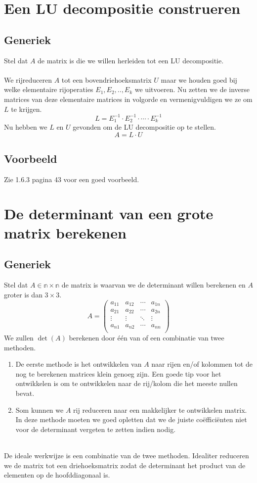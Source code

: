 \documentclass[lineaire_algebra_oplossingen.tex]{subfiles}
\begin{document}
\section{Een LU decompositie construeren}
\subsection*{Generiek}
Stel dat $A$ de matrix is die we willen herleiden tot een LU decompositie.\\\\
We rijreduceren $A$ tot een bovendriehoeksmatrix $U$ maar we houden goed bij welke elementaire rijoperaties $E_1,E_2,..,E_k$ we uitvoeren. Nu zetten we de inverse matrices van deze elementaire matrices in volgorde en vermenigvuldigen we ze om $L$ te krijgen.
\[
L = E_1^{-1} \cdot E_2^{-1} \cdot \cdots \cdot  E_k^{-1}
\] 
Nu hebben we $L$ en $U$ gevonden om de LU decompositie op te stellen.
\[
A = L\cdot U
\]
\subsection*{Voorbeeld}
Zie 1.6.3 pagina 43 voor een goed voorbeeld.

\section{De determinant van een grote matrix berekenen}
\subsection*{Generiek}
Stel dat $A \in \mathbb{n\times n}$ de matrix is waarvan we de determinant willen berekenen en $A$ groter is dan $3\times 3$.
\[
A = 
\begin{pmatrix}
a_{11} & a_{12} & \cdots & a_{1n}\\
a_{21} & a_{22} & \cdots & a_{2n}\\
\vdots & \vdots & \ddots & \vdots\\
a_{n1} & a_{n2} & \cdots & a_{nn}\\
\end{pmatrix}
\]
We zullen $\det(A)$ berekenen door \'e\'en van of een combinatie van twee methoden.
\begin{enumerate}
\item De eerste methode is het ontwikkelen van $A$ naar rijen en/of kolommen tot de nog te berekenen matrices klein genoeg zijn. Een goede tip voor het ontwikkelen is om te ontwikkelen naar de rij/kolom die het meeste nullen bevat.

\item Som kunnen we $A$ rij reduceren naar een makkelijker te ontwikkelen matrix.
In deze methode moeten we goed opletten dat we de juiste co\"effici\"enten niet voor de determinant vergeten te zetten indien nodig.\\\\
\end{enumerate}
De ideale werkwijze is een combinatie van de twee methoden.
Idealiter reduceren we de matrix tot een driehoeksmatrix zodat de determinant het product van de elementen op de hoofddiagonaal is.
\end{document}
